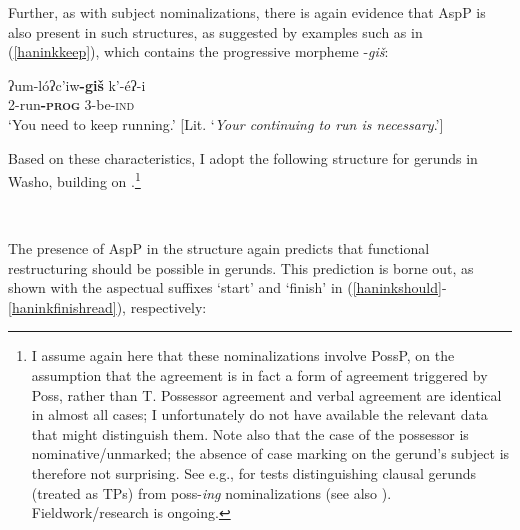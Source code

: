 \documentclass[output=paper]{langscibook}
\begin{document}
Further, as with subject nominalizations, there is again evidence that AspP is also present in such structures, as suggested by examples such as in (\ref{haninkkeep}), which contains the progressive morpheme -{\itshape giš}:

\ea\gll ʔum-lóʔc'iw{\bf-giš} k'-éʔ-i\\
2-run\textbf{\textsc{-prog}} 3-be-{\scshape ind}\\
\glt `You need to keep running.' [Lit. `{\itshape Your continuing to run is necessary}.'] \label{haninkkeep}
\z


Based on these characteristics, I adopt the following structure for gerunds in Washo, building on \cite{kratzer1996}.\footnote{I assume again here that these nominalizations involve PossP, on the assumption that the agreement is in fact a form of agreement triggered by Poss, rather than T. Possessor agreement and verbal agreement are identical in almost all cases; I unfortunately do not have available the relevant data that might distinguish them. Note also that the case of the possessor is nominative/unmarked; the absence of case marking on the gerund's subject is therefore not surprising. See e.g., \cite{pires2007} for tests distinguishing clausal gerunds (treated as TPs) from poss-{\itshape ing} nominalizations (see also \citealt{chomsky1970,abney1987}). Fieldwork/research is ongoing.} 

\ea \label{haninkgerundstructure}\

\vspace{-1em}\hspace{-2em}
 \z 
 
 
\vspace{-1em}

The presence of AspP in the structure again predicts that functional restructuring should be possible in gerunds. This prediction is borne out, as shown with the aspectual suffixes `start' and `finish' in (\ref{haninkshould}-\ref{haninkfinishread}), respectively:
\end{document}
